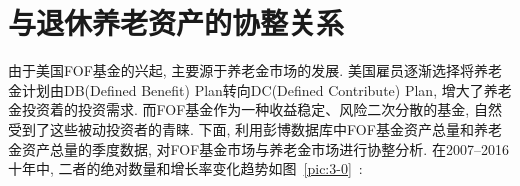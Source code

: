 
\section{与退休养老资产的协整关系}
由于美国FOF基金的兴起, 主要源于养老金市场的发展. 美国雇员逐渐选择将养老金计划由DB(Defined Benefit) Plan转向DC(Defined Contribute) Plan, 增大了养老金投资着的投资需求. 而FOF基金作为一种收益稳定、风险二次分散的基金, 自然受到了这些被动投资者的青睐. 下面, 利用彭博数据库中FOF基金资产总量和养老金资产总量的季度数据, 对FOF基金市场与养老金市场进行协整分析. 在2007--2016十年中, 二者的绝对数量和增长率变化趋势如图~\ref{pic:3-0}~:



